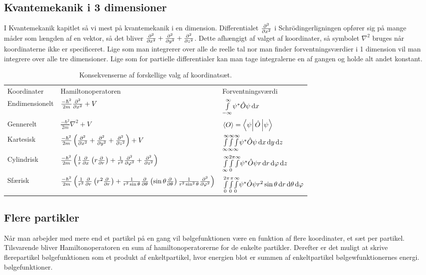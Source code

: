 \documentclass[../main.tex]{subfiles}
\begin{document}
\subsection{Kvantemekanik i 3 dimensioner}
I Kvantemekanik kapitlet så vi mest på kvantemekanik i en dimension.
Differentialet $\pdif[2]{x}{}$ i Schrödingerligningen opfører sig på mange måder som længden af en vektor, så det bliver $\pdif[2]{x}{}+\pdif[2]{y}{}+\pdif[2]{z}{}$. Dette afhængigt af valget af koordinater, så symbolet $\nabla ^2$ bruges når koordinaterne ikke er specificeret. Lige som man integrerer over alle de reelle tal nor man finder forventningsværdier i 1 dimension vil man integrere over alle tre dimensioner. Lige som for partielle differentialer kan man tage integralerne en af gangen og holde alt andet konstant.
\begin{table}[]
    \centering
    \begin{tabular}{l l l}
Koordinater &   Hamiltonoperatoren                              &   Forventningsværdi\\
Endimensionelt & $\frac{-\hbar^2}{2m}\pdif[2]{x}{}+V$ & $\integral{\psi^*\op O\psi}{x}{-\infty}{\infty}$\\
Gennerelt   &   $\frac{-\hbar^2}{2m}\nabla^2+V$ &   $\expect O = \matrixel{\psi}{\op O}{\psi}$\\
Kartesisk   &   $\frac{-\hbar^2}{2m}\left(\pdif[2]{x}{}+\pdif[2]{y}{}+\pdif[2]{z}{}\right)+V$
&   $\integral{\integral{\integral{\psi^*\op O\psi}{x}{\-\infty}{\infty}}{y}{\-\infty}{\infty}}{z}{\-\infty}{\infty}$\\
Cylindrisk & $\frac{-\hbar^2}{2m}\left(\frac{1}{r}\pdif{x}{}\left(r\pdif{r}{}\right)+\frac{1}{r^2}\pdif[2]{\phi}{}+\pdif[2]{z}{}\right)$&$
\integral{\integral{\integral{\psi^*\op O\psi r}{r}{}{\infty}}{\phi}{0}{2\pi}}{z}{\-\infty}{\infty}$\\
Sfærisk &
$\frac{-\hbar^2}{2m}\left(\frac{1}{r^2}\pdif{r}{}\left(r^2\pdif{r}{}\right)+\frac{1}{r^2\sin\theta}\pdif{\theta}{}\left(\sin \theta\pdif{\theta}{}\right)\frac{1}{r^2\sin^2\theta}\pdif[2]{\phi}{}\right)$&
$\integral{\integral{\integral{\psi^*\op O\psi r^2\sin\theta}{r}{0}{\infty}}{\theta}{0}{\pi}}{\phi}{0}{2\pi}$
    \end{tabular}
    \caption{Konsekvenserne af forskellige valg af koordinatsæt.}
    \label{tab:kvant:koordinat}
\end{table}

\subsection{Flere partikler}
Når man arbejder med mere end et partikel på en gang vil bølgefunktionen være en funktion af flere koordinater, et sæt per partikel. Tilsvarende bliver Hamiltonoperatoren en sum af hamiltonoperatorerne for de enkelte partikler.
Derefter er det muligt at skrive flerepartikel bølgefunktionen som et produkt af enkeltpartikel, hvor energien blot er summen af enkeltpartikel bølgewfunktionernes energi. bølgefunktioner.
\end{document}

